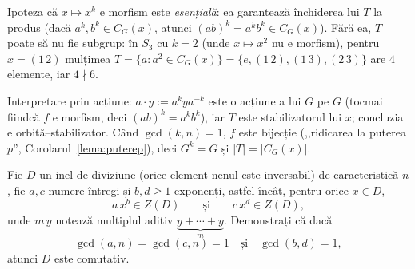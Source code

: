 \begin{obs}
Ipoteza că $x\mapsto x^{k}$ e morfism este \emph{esențială}:
ea garantează închiderea lui $T$ la produs (dacă
$a^{k},b^{k}\in C_{G}(x)$, atunci $(ab)^{k}=a^{k}b^{k}\in C_{G}(x)$). Fără
ea, $T$ poate să nu fie subgrup: în $S_{3}$ cu $k=2$ (unde
$x\mapsto x^{2}$ nu e morfism), pentru $x=(1\,2)$ mulțimea $T=\{a:a^{2}\in
C_{G}(x)\}=\{e,(1\,2),(1\,3),(2\,3)\}$ are $4$ elemente, iar $4\nmid 6$.

Interpretare prin acțiune: $a\cdot y:=a^{k}ya^{-k}$ este o acțiune a
lui $G$ pe $G$ (tocmai fiindcă $f$ e morfism, deci $(ab)^{k}=a^{k}b^{k}$),
iar $T$ este stabilizatorul lui $x$; concluzia e orbită--stabilizator.
Când $\gcd(k,n)=1$, $f$ este bijecție (,,ridicarea la puterea $p$'',
Corolarul~\ref{lema:puterep}), deci $G^{k}=G$ și $|T|=|C_{G}(x)|$.
\end{obs}

\begin{problema}
Fie $D$ un inel de diviziune (orice element nenul este inversabil) de
caracteristică $n$, fie $a,c$ numere întregi și $b,d\ge 1$
exponenți, astfel încât, pentru orice $x\in D$,
\[
  a\,x^{b}\in Z(D)\qquad\text{și}\qquad c\,x^{d}\in Z(D),
\]
unde $m\,y$ notează multiplul aditiv $\underbrace{y+\cdots+y}_{m}$.
Demonstrați că dacă
\[
  \gcd(a,n)=\gcd(c,n)=1\quad\text{și}\quad \gcd(b,d)=1,
\]
atunci $D$ este comutativ.
\end{problema}

